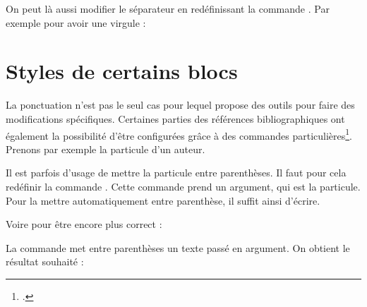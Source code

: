 \bibverbose
\begin{quotation}
\cites{Saxer1980}{Junod1992}
\end{quotation}
\bibverbosetrad

On peut là aussi modifier le séparateur en redéfinissant la commande . Par exemple pour avoir une virgule :

\begin{latexcode}
\renewcommand{\multicitedelim}[0]{\addcomma\addspace}
\end{latexcode}


\section{Styles de certains blocs}

La ponctuation n'est pas le seul cas pour lequel   propose des outils pour faire des modifications spécifiques. Certaines parties des références bibliographiques ont également  la possibilité d'être configurées grâce à des commandes particulières\footcite{biblatex_hooks}. Prenons par exemple la particule d'un auteur.
    
    \bibverbose
    \begin{quotation}
    \cite{BeauvoirSexe}
    \end{quotation}
    
    \renewcommand{\mkbibnameprefix}[1]{\parentext{#1}}


    
Il est parfois d'usage de mettre la particule entre parenthèses. Il faut pour cela redéfinir la commande . Cette commande prend un argument, qui est la particule. Pour la mettre automatiquement entre parenthèse, il suffit ainsi d'écrire.
    
    \begin{latexcode}
\renewcommand{\mkbibnameprefix}[1]{(#1)}
    \end{latexcode}

    
Voire pour être encore plus correct :
    
    \begin{latexcode}
\renewcommand{\mkbibnameprefix}[1]{\parentext{#1}}
    \end{latexcode}


La commande  met entre parenthèses un texte passé en argument. On obtient le résultat souhaité : 

    \begin{quotation}
    \cite{BeauvoirSexe}
    \end{quotation}
    
